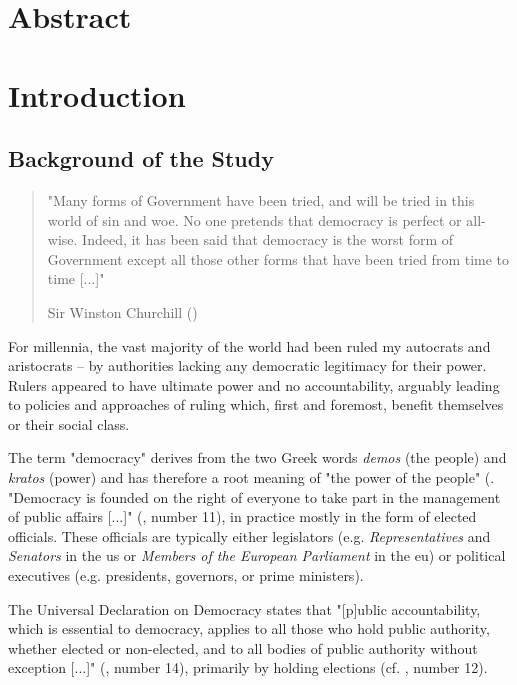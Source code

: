 \chapter{Abstract}

\chapter{Introduction} \label{ch:introduction}
\section{Background of the Study} %

\begin{quote}
    "Many forms of Government have been tried, and will be tried in this world of sin and woe. No one pretends that democracy is perfect or all-wise. Indeed, it has been said that democracy is the worst form of Government except all those other forms that have been tried from time to time [...]"
    
    Sir Winston Churchill (\cite{HouseofCommons.1947})
\end{quote}

For millennia, the vast majority of the world had been ruled my autocrats and aristocrats -- by authorities lacking any democratic legitimacy for their power. Rulers appeared to have ultimate power and no accountability, arguably leading to policies and approaches of ruling which, first and foremost, benefit themselves or their social class.

The term "democracy" derives from the two Greek words \textit{demos} (the people) and \textit{kratos} (power) and has therefore a root meaning of "the power of the people" (\cite{Ober.2007}. "Democracy is founded on the right of everyone to take part in the management of public affairs [...]" (\cite{InterParliamentaryUnion.1997}, number 11), in practice mostly in the form of elected officials. These officials are typically either legislators (e.g. \textit{Representatives} and \textit{Senators} in the \acrshort{us} or \textit{Members of the European Parliament} in the \acrshort{eu}) or political executives (e.g. presidents, governors, or prime ministers).

The Universal Declaration on Democracy states that "[p]ublic accountability, which is essential to democracy, applies to all those who hold public authority, whether elected or non-elected, and to all bodies of public authority without exception [...]" (\cite{InterParliamentaryUnion.1997}, number 14), primarily by holding elections (cf. \cite{InterParliamentaryUnion.1997}, number 12).

